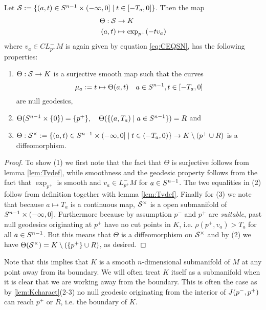 \begin{proposition}\label{prop:thetaconstr}
    Let ${\mathcal{S}}:=\{(a,t)\in {S^{n-1}} \times (-\infty,0]\mid t \in [-T_a,0]\}$.
    Then the map
    \begin{align*}
        \Theta:{\mathcal{S}}&\to K\\
        (a,t)&\mapsto \exp_{p^+}(-tv_a)
    \end{align*} where $v_a\in CL^-_{p^+}M$ is again given by equation \ref{eq:CEQSN}, has the following properties:
    \begin{enumerate}[label=\textnormal{(\arabic*)}]
        \item $\Theta:{\mathcal{S}}\to K$ is a surjective smooth map such that the curves 
        \[\mu_a:=t\mapsto\Theta(a,t) \quad a\in {S^{n-1}}, t\in [-T_a,0]\] are null geodesics,
        \item $\Theta(S^{n-1}\times\{0\}) = \{p^+\}, \quad \Theta(\{(a,T_a)\mid a\in {S^{n-1}}\}) = R$ and
        \item $\Theta:{\mathcal{S}}^\times:=\{(a,t)\in {S^{n-1}} \times (-\infty,0]\mid t \in (-T_a,0)\}\to K\setminus ({p^+} \cup R)$ is a diffeomorphism.
    \end{enumerate}
\end{proposition}
\begin{proof}
    To show (1) we first note that the fact that $\Theta$ is surjective follows from lemma \ref{lem:Tvdef}, while smoothness and the geodesic property follows from the fact that $\exp_{p^+}$ is smooth and $v_a\in L^-_{p^+}M$ for $a\in {S^{n-1}}$.
    The two equalities in (2) follow from definition together with lemma \ref{lem:Tvdef}.
    Finally for (3) we note that because $a\mapsto T_a$ is a continuous map, ${\mathcal{S}}^\times$ is a open submanifold of ${S^{n-1}}\times (-\infty,0]$. Furthermore because by assumption $p^-$ and $p^+$ are \emph{suitable}, past null geodesics originating at $p^+$ have no cut points in $K$, i.e. $\rho(p^+,v_a)>T_a$ for all $a\in {S^{n-1}}$. But this means that $\Theta$ is a diffeomorphism on ${\mathcal{S}}^\times$ and by (2) we have $\Theta({\mathcal{S}}^\times)=K\setminus (\{p^+\}\cup R)$, as desired.
\end{proof}


Note that this implies that $K$ is a smooth $n$-dimensional submanifold of $M$ at any point away from its boundary. We will often treat $K$ itself as a submanifold when it is clear that we are working away from the boundary. This is often the case as by \ref{lem:Kcharact}(2-3) no null geodesic originating from the interior of $J(p^-,p^+)$ can reach $p^+$ or $R$, i.e. the boundary of $K$.

